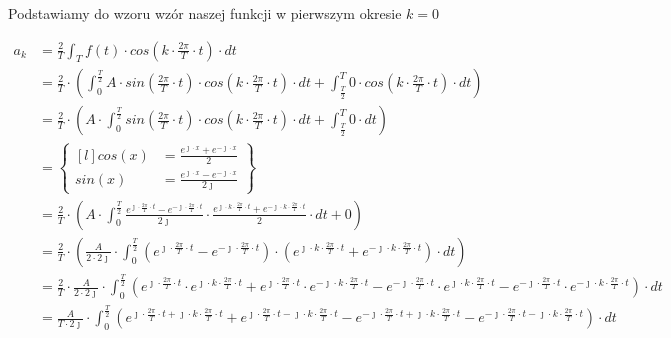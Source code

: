 \begin{task}
Podstawiamy do wzoru wzór naszej funkcji w pierwszym okresie $k=0$

\begin{align*}
a_k&=\frac{2}{T}\int_{T}f(t) \cdot cos\left( k \cdot \frac{2\pi}{T} \cdot t\right) \cdot dt\\
&=\frac{2}{T}\cdot\left(\int_{0}^{\frac{T}{2}}A \cdot sin\left( \frac{2\pi}{T} \cdot t\right) \cdot cos\left( k \cdot \frac{2\pi}{T} \cdot t\right) \cdot dt+\int_{\frac{T}{2}}^{T} 0 \cdot cos\left( k \cdot \frac{2\pi}{T} \cdot t\right) \cdot dt\right)\\
&=\frac{2}{T}\cdot\left(A \cdot \int_{0}^{\frac{T}{2}}sin\left( \frac{2\pi}{T} \cdot t\right) \cdot cos\left( k \cdot \frac{2\pi}{T} \cdot t\right) \cdot dt+\int_{\frac{T}{2}}^{T} 0 \cdot dt\right)\\
&=\begin{Bmatrix*}[l]
cos\left(x\right)&=\frac{e^{\jmath \cdot x}+e^{-\jmath \cdot x}}{2}\\
sin\left(x\right)&=\frac{e^{\jmath \cdot x}-e^{-\jmath \cdot x}}{2 \jmath }
\end{Bmatrix*}\\
&=\frac{2}{T}\cdot\left(A \cdot \int_{0}^{\frac{T}{2}} \frac{e^{\jmath \cdot \frac{2\pi}{T} \cdot t}-e^{-\jmath \cdot \frac{2\pi}{T} \cdot t}}{2\jmath} \cdot \frac{e^{\jmath \cdot k \cdot \frac{2\pi}{T} \cdot t}+e^{-\jmath \cdot k \cdot \frac{2\pi}{T} \cdot t}}{2} \cdot dt+0\right)\\
&=\frac{2}{T}\cdot\left(\frac{A}{2\cdot 2\jmath} \cdot \int_{0}^{\frac{T}{2}} \left(e^{\jmath \cdot \frac{2\pi}{T} \cdot t}-e^{-\jmath \cdot \frac{2\pi}{T} \cdot t}\right)\cdot \left(e^{\jmath \cdot k \cdot \frac{2\pi}{T} \cdot t}+e^{-\jmath \cdot k \cdot \frac{2\pi}{T} \cdot t}\right) \cdot dt\right)\\
&=\frac{2}{T} \cdot \frac{A}{2\cdot 2\jmath} \cdot \int_{0}^{\frac{T}{2}}
\left(e^{\jmath \cdot \frac{2\pi}{T} \cdot t} \cdot e^{\jmath \cdot k \cdot \frac{2\pi}{T} \cdot t} + e^{\jmath \cdot \frac{2\pi}{T} \cdot t} \cdot e^{-\jmath \cdot k \cdot \frac{2\pi}{T} \cdot t} - e^{-\jmath \cdot \frac{2\pi}{T} \cdot t} \cdot e^{\jmath \cdot k \cdot \frac{2\pi}{T} \cdot t} - e^{-\jmath \cdot \frac{2\pi}{T} \cdot t} \cdot e^{-\jmath \cdot k \cdot \frac{2\pi}{T} \cdot t} \right) \cdot dt\\
&=\frac{A}{T\cdot 2\jmath} \cdot \int_{0}^{\frac{T}{2}}
\left(e^{\jmath \cdot \frac{2\pi}{T} \cdot t + \jmath \cdot k \cdot \frac{2\pi}{T} \cdot t} + e^{\jmath \cdot \frac{2\pi}{T} \cdot t -\jmath \cdot k \cdot \frac{2\pi}{T} \cdot t} - e^{-\jmath \cdot \frac{2\pi}{T} \cdot t+ \jmath \cdot k \cdot \frac{2\pi}{T} \cdot t} - e^{-\jmath \cdot \frac{2\pi}{T} \cdot t -\jmath \cdot k \cdot \frac{2\pi}{T} \cdot t} \right) \cdot dt\\

\end{align*}
\end{task}
